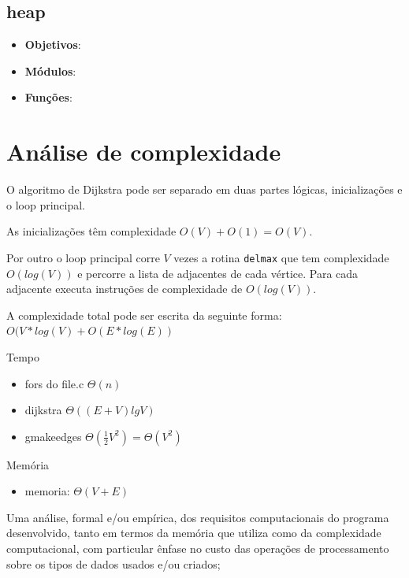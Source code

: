 \documentclass[portuguese, a4paper]{article}
\newcommand\tu[0]{\textunderscore}
\begin{document}
	\subsection{heap}
	\begin{itemize}
		\item \textbf{Objetivos}: \\
		\item \textbf{Módulos}: \\
		\item \textbf{Funções}: \\
	\end{itemize}


\section{Análise de complexidade}
	\par
	O algoritmo de Dijkstra pode ser separado em duas partes
lógicas, inicializações e o loop principal.
	\par
	As inicializações têm complexidade $O(V) + O(1) = O(V)$.
	\par
	Por outro o loop principal corre $V$ vezes a rotina \texttt{delmax} que tem
complexidade $O(log(V))$ e percorre a lista de adjacentes de cada vértice. Para
cada adjacente executa instruções de complexidade de $O(log(V))$.
	\par A complexidade total pode ser escrita da seguinte forma:
$O(V*log(V) + O(E*log(E))$
	\par
	Tempo
	\begin{itemize}
		\item fors do file.c $\Theta(n)$
		\item dijkstra $\Theta((E+V) lg V)$
		\item g\tu make\tu edges $\Theta(\frac{1}{2}V^2) = \Theta(V^2)$
	\end{itemize}
	\par
	Memória
	\begin{itemize}
		\item memoria: $\Theta(V + E)$
	\end{itemize}
	\par
	Uma análise, formal e/ou empírica, dos requisitos computacionais do programa
	desenvolvido, tanto em termos da memória que utiliza como da complexidade
	computacional, com particular ênfase no custo das operações de processamento
	sobre os tipos de dados usados e/ou criados;
\end{document}
